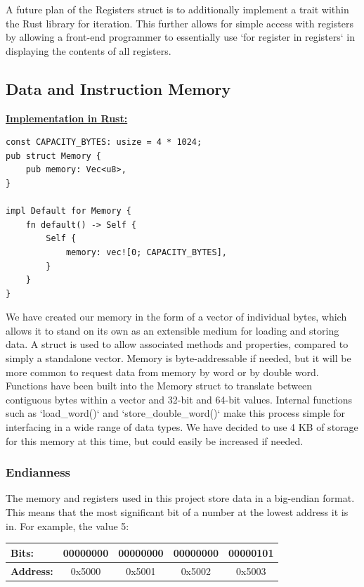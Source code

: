 \documentclass[
    paper=letter,
    parskip=half,
    fontsize=12pt,
    titlepage=firstiscover,
    toc=bibliography,
    numbers=endperiod
]{scrartcl}
\begin{document}

A future plan of the Registers struct is to additionally implement a
trait within the Rust library for iteration. This further allows for
simple access with registers by allowing a front-end programmer to
essentially use `for register in registers` in displaying the contents
of all registers.

\subsection{Data and Instruction Memory}

\underline{\textbf{Implementation in Rust:}}
\begin{verbatim}
const CAPACITY_BYTES: usize = 4 * 1024;
pub struct Memory {
    pub memory: Vec<u8>,
}

impl Default for Memory {
    fn default() -> Self {
        Self {
            memory: vec![0; CAPACITY_BYTES],
        }
    }
}
\end{verbatim}

We have created our memory in the form of a vector of individual bytes,
which allows it to stand on its own as an extensible medium for loading
and storing data. A struct is used to allow associated methods and
properties, compared to simply a standalone vector. Memory is
byte-addressable if needed, but it will be more common to request data
from memory by word or by double word. Functions have been built into
the Memory struct to translate between contiguous bytes within a vector
and 32-bit and 64-bit values. Internal functions such as `load\_word()`
and `store\_double\_word()` make this process simple for interfacing in
a wide range of data types. We have decided to use 4 KB of storage for
this memory at this time, but could easily be increased if needed.


\subsubsection{Endianness}


The memory and registers used in this project store data in a big-endian
format. This means that the most significant bit of a number at the
lowest address it is in. For example, the value 5:

\begin{tabularx}{\textwidth}{|l|c|c|c|c|}
    \hline
    \textbf{Bits:}    & 00000000 & 00000000 & 00000000 & 00000101 \\\hline
    \textbf{Address:} & 0x5000   & 0x5001   & 0x5002   & 0x5003 \\\hline
\end{tabularx}
\end{document}
